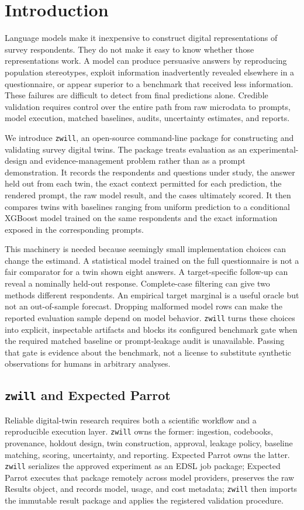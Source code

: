 \documentclass[11pt]{article}
\newcommand{\zwill}{\texttt{zwill}}
\begin{document}
\section{Introduction}
Language models make it inexpensive to construct digital representations of
survey respondents. They do not make it easy to know whether those
representations work. A model can produce persuasive answers by reproducing
population stereotypes, exploit information inadvertently revealed elsewhere
in a questionnaire, or appear superior to a benchmark that received less
information. These failures are difficult to detect from final predictions
alone. Credible validation requires control over the entire path from raw
microdata to prompts, model execution, matched baselines, audits, uncertainty
estimates, and reports.

We introduce \zwill, an open-source command-line package for constructing
and validating survey digital twins. The package treats evaluation as an
experimental-design and evidence-management problem rather than as a prompt
demonstration. It records the respondents and questions under study, the answer
held out from each twin, the exact context permitted for each prediction, the
rendered prompt, the raw model result, and the cases ultimately scored. It then
compares twins with baselines ranging from uniform prediction to a conditional
XGBoost model trained on the same respondents and the exact information exposed
in the corresponding prompts.

This machinery is needed because seemingly small implementation choices can
change the estimand. A statistical model trained on the full questionnaire is
not a fair comparator for a twin shown eight answers. A target-specific
follow-up can reveal a nominally held-out response. Complete-case filtering can
give two methods different respondents. An empirical target marginal is a
useful oracle but not an out-of-sample forecast. Dropping malformed model rows
can make the reported evaluation sample depend on model behavior. \zwill{} turns
these choices into explicit, inspectable artifacts and blocks its configured
benchmark gate when the required matched baseline or prompt-leakage audit is
unavailable. Passing that gate is evidence about the benchmark, not a license
to substitute synthetic observations for humans in arbitrary analyses.

\subsection{\zwill{} and Expected Parrot}
Reliable digital-twin research requires both a scientific workflow and a
reproducible execution layer. \zwill{} owns the former: ingestion, codebooks,
provenance, holdout design, twin construction, approval, leakage policy,
baseline matching, scoring, uncertainty, and reporting. Expected Parrot owns
the latter. \zwill{} serializes the approved experiment as an EDSL job package;
Expected Parrot executes that package remotely across model providers,
preserves the raw Results object, and records model, usage, and cost metadata;
\zwill{} then imports the immutable result package and applies the registered
validation procedure.
\end{document}

